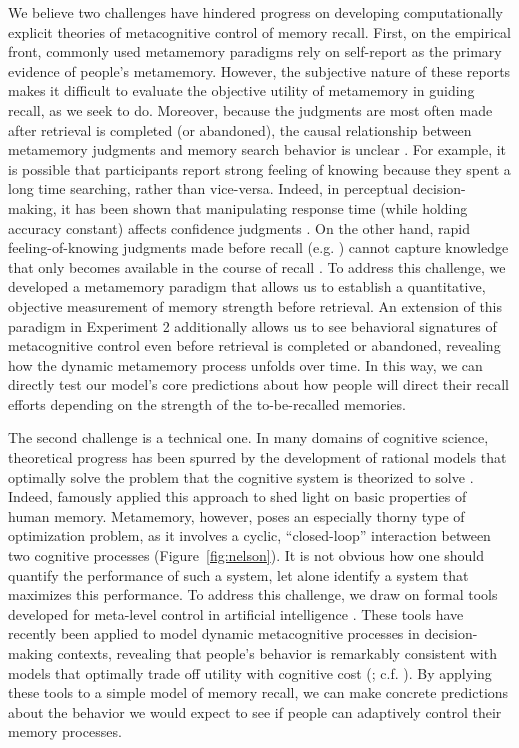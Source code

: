 We believe two challenges have hindered progress on developing computationally explicit theories of metacognitive control of memory recall. First, on the empirical front, commonly used metamemory paradigms rely on self-report as the primary evidence of people's metamemory. However, the subjective nature of these reports makes it difficult to evaluate the objective utility of metamemory in guiding recall, as we seek to do. Moreover, because the judgments are most often made after retrieval is completed (or abandoned), the causal relationship between metamemory judgments and memory search behavior is unclear \citep{schwartz2001relation}. For example, it is possible that participants report strong feeling of knowing because they spent a long time searching, rather than vice-versa. Indeed, in perceptual decision-making, it has been shown that manipulating response time (while holding accuracy constant) affects confidence judgments \citep{kiani2014choice}. On the other hand, rapid feeling-of-knowing judgments made before recall (e.g. \citealp{reder1987strategy}) cannot capture knowledge that only becomes available in the course of recall \citep{koriat1993how,nhouyvanisvong1998rapid}. To address this challenge, we developed a metamemory paradigm that allows us to establish a quantitative, objective measurement of memory strength before retrieval. An extension of this paradigm in Experiment 2 additionally allows us to see behavioral signatures of metacognitive control even before retrieval is completed or abandoned, revealing how the dynamic metamemory process unfolds over time. In this way, we can directly test our model's core predictions about how people will direct their recall efforts depending on the strength of the to-be-recalled memories.

The second challenge is a technical one. In many domains of cognitive science, theoretical progress has been spurred by the development of rational models that optimally solve the problem that the cognitive system is theorized to solve \citep{savage1954foundations,tenenbaum2001generalization,anderson1991adaptive,knill1996perception,marr1982vision}. Indeed, \citet{anderson1989human} famously applied this approach to shed light on basic properties of human memory. Metamemory, however, poses an especially thorny type of optimization problem, as it involves a cyclic, ``closed-loop'' interaction between two cognitive processes (Figure~\ref{fig:nelson}). It is not obvious how one should quantify the performance of such a system, let alone identify a system that maximizes this performance. To address this challenge, we draw on formal tools developed for meta-level control in artificial intelligence \citep{russell1991principles,hay2016principles}. These tools have recently been applied to model dynamic metacognitive processes in decision-making contexts, revealing that people's behavior is remarkably consistent with models that optimally trade off utility with cognitive cost (\citealp{callaway2021fixation,callaway2022rational}; c.f. \citealp{drugowitsch2012cost,tajima2019optimal,jang2021optimal,chen2021apparently}). By applying these tools to a simple model of memory recall, we can make concrete predictions about the behavior we would expect to see if people can adaptively control their memory processes.


